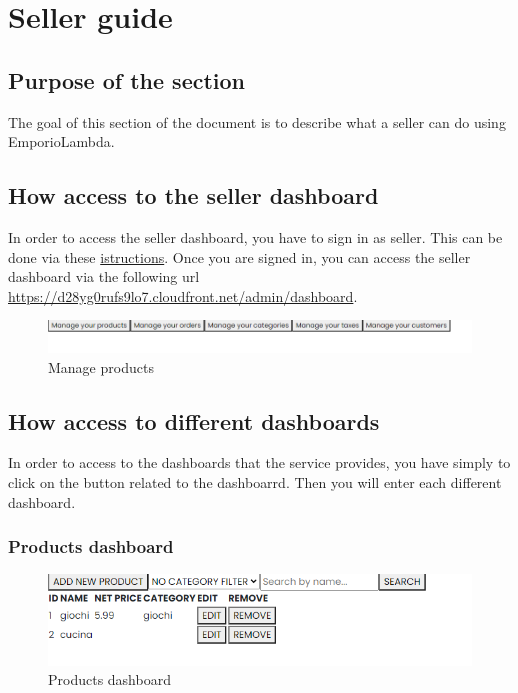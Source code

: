 \section{Seller guide} \label{_venditore}
\subsection{Purpose of the section}
The goal of this section of the document is to describe what a seller can do using EmporioLambda.

\subsection{How access to the seller dashboard} \label{_adminlogin}
In order to access the seller dashboard, you have to sign in as seller. This can be done via these \hyperref[_signin]{istructions}.
Once you are signed in, you can access the seller dashboard via the following url \url{https://d28yg0rufs9lo7.cloudfront.net/admin/dashboard}.
\begin{figure}[H]
    \centering
    \includegraphics[width=\linewidth]{res/images/venditore/dashboard.png}
    \caption{Manage products}
\end{figure}

\subsection{How access to different dashboards} \label{_dashboard}
In order to access to the dashboards that the service provides, you have simply to click on the button related to the dashboarrd. Then you will enter each different dashboard.

\subsubsection{Products dashboard} \label{_productmanagement}
\begin{figure}[H]
    \centering
    \includegraphics[width=\linewidth]{res/images/venditore/productmanagement.png}
    \caption{Products dashboard}
\end{figure}

